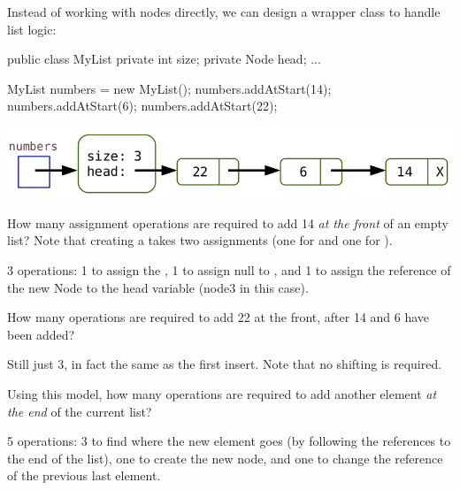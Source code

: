 Instead of working with nodes directly, we can design a wrapper class to handle list logic:

\vspace{1ex}
\begin{minipage}{0.40\linewidth}
\begin{javalst}
    public class MyList
    {
        private int size;
        private Node head;
        ...
    }
\end{javalst}
\end{minipage}
\hfill
\begin{minipage}{0.58\linewidth}
\begin{javalst}
    MyList numbers = new MyList();
    numbers.addAtStart(14);
    numbers.addAtStart(6);
    numbers.addAtStart(22);
\end{javalst}
\includegraphics[scale=0.35]{figs/list3.png}
\end{minipage}
\vspace{1ex}




\Q How many assignment operations are required to add 14 \textit{at the front} of an empty list? Note that creating a  takes two assignments (one for  and one for ).

\begin{answer}
3 operations: 1 to assign the , 1 to assign null to , and 1 to assign the reference of the new Node to the head variable (node3 in this case).
\end{answer}


\Q How many operations are required to add 22 at the front, after 14 and 6 have been added?

\begin{answer}
Still just 3, in fact the same as the first insert. Note that no shifting is required.
\end{answer}


\Q Using this model, how many operations are required to add another element \textit{at the end} of the current list?

\begin{answer}
5 operations: 3 to find where the new element goes (by following the references to the end of the list), one to create the new node, and one to change the reference of the previous last element.
\end{answer}


